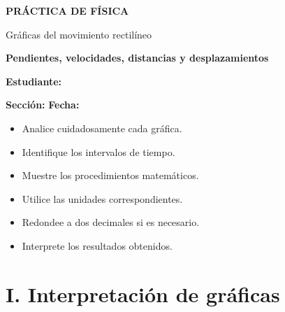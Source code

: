 \documentclass[11pt,letterpaper]{article}
\begin{document}
\begin{center}

{\Large
\bfseries
\textcolor{azul}{
PRÁCTICA DE FÍSICA
}
}

\vspace{0.2cm}

{\large
Gráficas del movimiento rectilíneo
}

\vspace{0.2cm}

\textcolor{verde}{
\textbf{
Pendientes, velocidades,
distancias y desplazamientos
}
}

\end{center}

\begin{tcolorbox}[
 colback=gris,
 colframe=azul,
 arc=2mm
]

\textbf{Estudiante:}
\hrulefill

\vspace{0.3cm}

\textbf{Sección:}
\underline{\hspace{3cm}}
\hfill
\textbf{Fecha:}
\underline{\hspace{3cm}}

\end{tcolorbox}

\begin{tcolorbox}[
 colback=celeste,
 colframe=azul,
 title={Indicaciones}
]

\begin{itemize}[leftmargin=*]
\item Analice cuidadosamente cada gráfica.
\item Identifique los intervalos de tiempo.
\item Muestre los procedimientos matemáticos.
\item Utilice las unidades correspondientes.
\item Redondee a dos decimales si es necesario.
\item Interprete los resultados obtenidos.
\end{itemize}

\end{tcolorbox}

\section*{I. Interpretación de gráficas}
\end{document}
